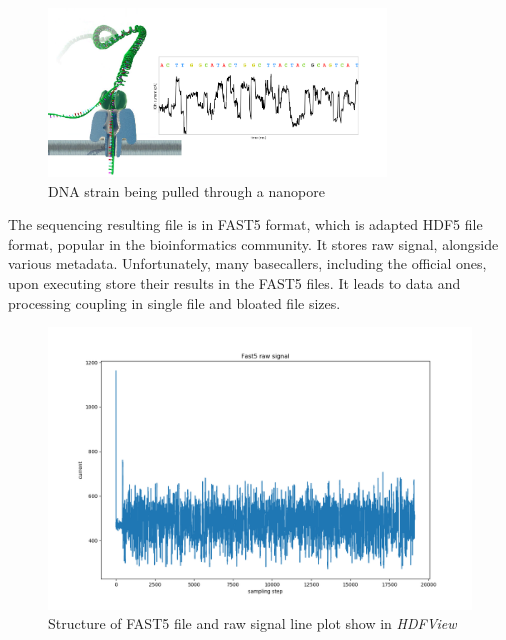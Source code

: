 \documentclass[times, utf8, diplomski, english]{fer}
\begin{document}
\begin{figure}[!ht]
    \begin{center}
        \includegraphics[width=0.8\textwidth]{nanopore}
        
        \caption[DNA strain being pulled through a nanopore]{DNA strain being pulled through a nanopore \protect\footnotemark}
        \label{fg:nanopore}
    \end{center}
\end{figure}

The sequencing resulting file is in FAST5 format, which is adapted HDF5 file format, popular in the bioinformatics community. It stores raw signal, alongside various metadata. Unfortunately, many basecallers, including the official ones, upon executing store their results in the FAST5 files. It leads to data and processing coupling in single file and bloated file sizes. 

\begin{figure}
    \begin{center}
        \includegraphics[width=\textwidth]{fast5_sample}
        \caption[Structure of FAST5 file and raw signal plot show in \textit{HDFView}]{Structure of FAST5 file and raw signal line plot show in \textit{HDFView} \protect\footnotemark}
        \label{fg:fast5}
    \end{center}
\end{figure}
  
\end{document}
